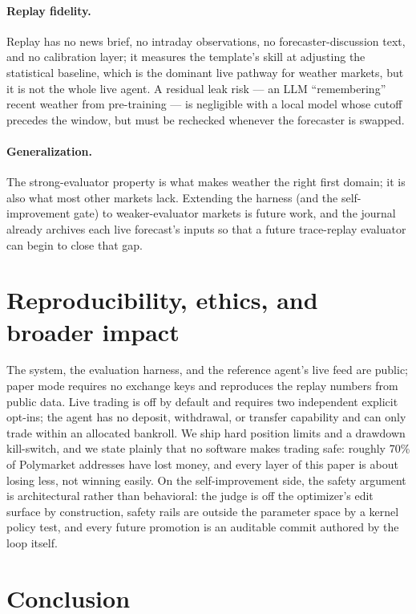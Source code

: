 \documentclass[sigconf,review,anonymous]{acmart}
\begin{document}
\paragraph{Replay fidelity.} Replay has no news brief, no intraday observations,
no forecaster-discussion text, and no calibration layer; it measures the
template's skill at adjusting the statistical baseline, which is the dominant live
pathway for weather markets, but it is not the whole live agent. A residual leak
risk --- an LLM ``remembering'' recent weather from pre-training --- is negligible
with a local model whose cutoff precedes the window, but must be rechecked
whenever the forecaster is swapped.

\paragraph{Generalization.} The strong-evaluator property is what makes weather
the right first domain; it is also what most other markets lack. Extending the
harness (and the self-improvement gate) to weaker-evaluator markets is future
work, and the journal already archives each live forecast's inputs so that a
future trace-replay evaluator can begin to close that gap.

\section{Reproducibility, ethics, and broader impact}

The system, the evaluation harness, and the reference agent's live feed are
public; paper mode requires no exchange keys and reproduces the replay numbers
from public data. Live trading is off by default and requires two independent
explicit opt-ins; the agent has no deposit, withdrawal, or transfer capability and
can only trade within an allocated bankroll. We ship hard position limits and a
drawdown kill-switch, and we state plainly that no software makes trading safe:
roughly 70\% of Polymarket addresses have lost money, and every layer of this
paper is about losing less, not winning easily. On the self-improvement side, the
safety argument is architectural rather than behavioral: the judge is off the
optimizer's edit surface by construction, safety rails are outside the parameter
space by a kernel policy test, and every future promotion is an auditable commit
authored by the loop itself.

\section{Conclusion}
\end{document}
